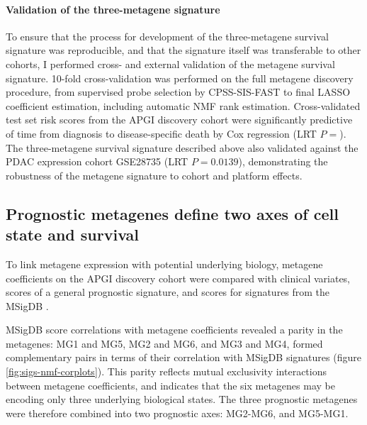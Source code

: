 \documentclass[dissertation.tex]{subfiles}
\begin{document}
\paragraph{Validation of the three-metagene signature}
To ensure that the process for development of the three-metagene survival signature was reproducible, and that the signature itself was transferable to other cohorts, I performed cross- and external validation of the metagene survival signature.  10-fold cross-validation was performed on the full metagene discovery procedure, from supervised probe selection by \gls{CPSS}-\gls{SIS}-\gls{FAST} to final \gls{LASSO} coefficient estimation, including automatic \gls{NMF} rank estimation.  Cross-validated test set risk scores from the \gls{APGI} discovery cohort were significantly predictive of time from diagnosis to disease-specific death by Cox regression (LRT $P = $).  The three-metagene survival signature described above also validated against the \gls{PDAC} expression cohort GSE28735 \cite{Zhang2013} (LRT $P = 0.0139$), demonstrating the robustness of the metagene signature to cohort and platform effects.  

\subsection{Prognostic metagenes define two axes of cell state and survival}
To link metagene expression with potential underlying biology, metagene coefficients on the \gls{APGI} discovery cohort were compared with clinical variates, scores of a general prognostic signature, and scores for signatures from the \gls{MSigDB} \cite{Subramanian2005}.

\gls{MSigDB} score correlations with metagene coefficients revealed a parity in the metagenes: MG1 and MG5, MG2 and MG6, and MG3 and MG4, formed complementary pairs in terms of their correlation with \gls{MSigDB signatures} (figure \ref{fig:sigs-nmf-corplots}).  This parity reflects mutual exclusivity interactions between metagene coefficients, and indicates that the six metagenes may be encoding only three underlying biological states.  The three prognostic metagenes were therefore combined into two prognostic axes: MG2-MG6, and MG5-MG1.
\end{document}
